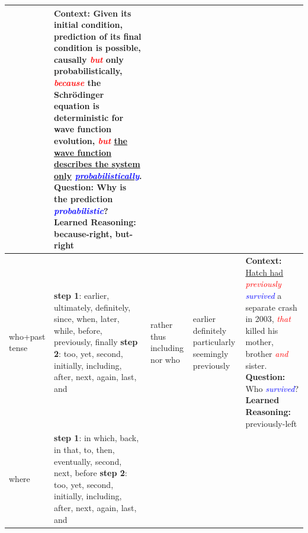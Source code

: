 \begin{table}[t]
{\begin{tabular}{|p{2cm}|p{4cm}|p{1.5cm}|p{1.5cm}|p{6cm}|}
  & \textbf{Context: }Given its initial condition, prediction of its final condition is possible, causally \textit{\textcolor{red}{but}} only probabilistically, \textit{\textcolor{red}{because}} the Schrödinger equation is deterministic for wave function evolution, \textit{\textcolor{red}{but}} \underline{the wave function describes the system only} \underline{\textit{\textcolor{blue}{probabilistically}}}.
  \newline \textbf{Question: }Why is the prediction \textit{\textcolor{blue}{probabilistic}}?
  \newline \textbf{Learned Reasoning: }because-right, but-right\\ 
	\hline	
	who+past tense 
	&\textbf{step 1}: earlier, ultimately, definitely, since, when, later, while, before, previously, finally \newline \textbf{step 2}: too, yet, second, initially, including, after, next, again, last, and  
	& rather \newline thus \newline including \newline nor \newline who & earlier \newline definitely \newline particularly \newline seemingly \newline previously
	
	& \textbf{Context: }\underline{Hatch had} \textit{\textcolor{red}{previously}} \textit{\textcolor{blue}{survived}} a separate crash in 2003, \textit{\textcolor{red}{that}} killed his mother, brother \textit{\textcolor{red}{and}} sister.
  \newline \textbf{Question: }Who \textit{\textcolor{blue}{survived}}?\newline \textbf{Learned Reasoning: }previously-left\\ 
	\hline
  where 
  & \textbf{step 1}: in which, back, in that, to, then, eventually, second, next, before \newline \textbf{step 2}: too, yet, second, initially, including, after, next, again, last, and
  

\end{tabular}}
\end{table}
